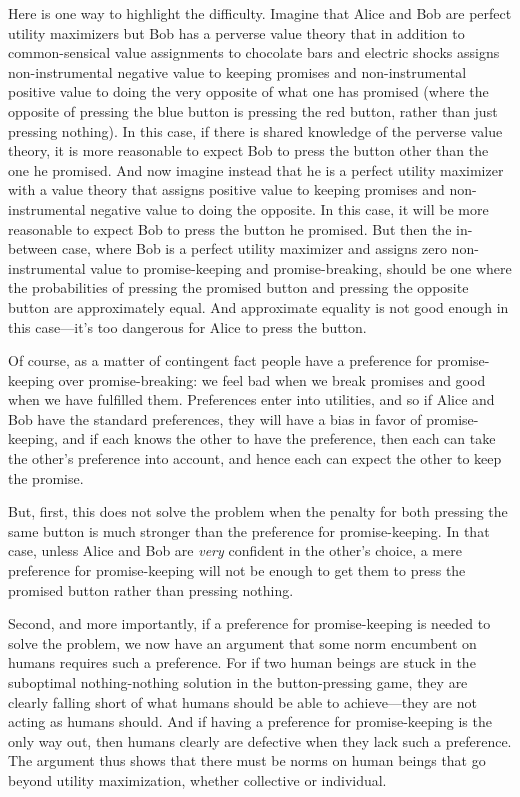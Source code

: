 Here is one way to highlight the difficulty. Imagine that Alice and Bob are perfect utility maximizers but Bob has a perverse value theory
that in addition to common-sensical value assignments to chocolate bars and electric shocks assigns non-instrumental negative value to keeping 
promises and non-instrumental positive value to doing the very opposite of what one has promised (where the opposite
of pressing the blue button is pressing the red button, rather than just pressing nothing). In this case, if 
there is shared knowledge of the perverse value theory, it 
is more reasonable to expect Bob to press the button other than the one he promised. And now imagine instead that he 
is a perfect utility maximizer with a value theory that assigns positive value to keeping promises and non-instrumental negative value
to doing the opposite. In this case, it will be more reasonable to expect Bob to press the button he promised. But 
then the in-between case, where Bob is a perfect utility maximizer and assigns zero non-instrumental value to 
promise-keeping and promise-breaking, should be one where the probabilities of pressing the promised button and 
pressing the opposite button are approximately equal. And approximate equality is not good enough in this case---it's
too dangerous for Alice to press the button.

Of course, as a matter of contingent fact people have a preference for promise-keeping over
promise-breaking: we feel bad when we break promises and good when we have fulfilled them. Preferences enter into utilities,
and so if Alice and Bob have the standard preferences, they will have a bias in favor of promise-keeping, and if each knows the
other to have the preference, then each can take the other's preference into account, and hence each can expect the other to keep
the promise. 

But, first, this does not solve the problem when the penalty for both pressing the same button is much 
stronger than the preference for promise-keeping. In that case, unless Alice and
Bob are \textit{very} confident in the other's choice, a mere preference for promise-keeping will not be
enough to get them to press the promised button rather than pressing nothing.

Second, and more importantly, if a preference for promise-keeping is needed to solve the problem, we now have an argument that
some norm encumbent on humans requires such a preference. For if two human beings are stuck in the suboptimal 
nothing-nothing solution in the button-pressing
game, they are clearly falling short of what humans should be able to achieve---they are not acting as humans should.
And if having a preference for promise-keeping is the only way out, then humans clearly are defective when they
lack such a preference. The argument thus shows that there must be norms on human
beings that go beyond utility maximization, whether collective or individual.

